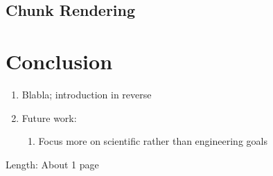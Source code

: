 \documentclass[journal]{vgtc}                %
\begin{document}
\subsection{Chunk Rendering}




\section{Conclusion} \label{sec:system}
\begin{enumerate}
  \item Blabla; introduction in reverse
  \item Future work:
  \begin{enumerate}
    \item Focus more on scientific rather than engineering goals
  \end{enumerate}
\end{enumerate}
Length: About 1 page


%

%
%
%


\end{document}

